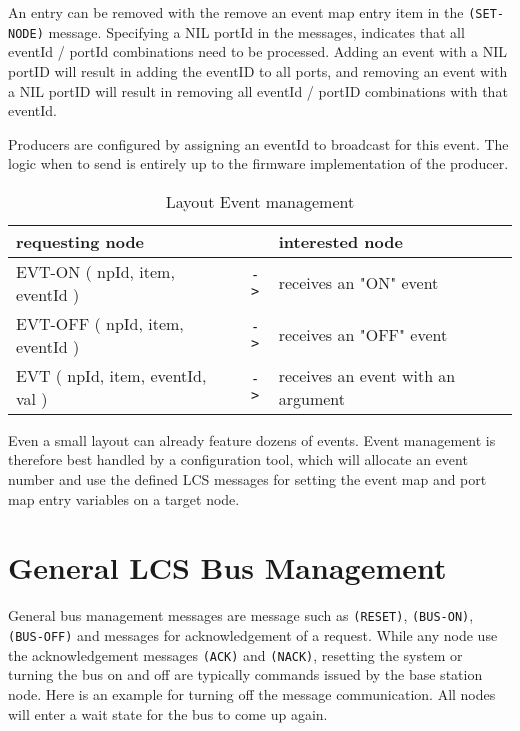 An entry can be removed with the remove an event map entry item in the \texttt{(SET-NODE)} message. Specifying a NIL portId in the messages, indicates that all eventId / portId combinations need to be processed. Adding an event with a NIL portID will result in adding the eventID to all ports, and removing an event with a NIL portID will result in removing all eventId / portID combinations with that eventId.

Producers are configured by assigning an eventId to broadcast for this event. The logic when to send is entirely up to the firmware implementation of the producer.

\begin{table}[ht!]
    \begin{center}
        \caption{Layout Event management}
        \begin{tabular}{|p{}| c |p{}|}
            \toprule
            \textbf{requesting node} & & \textbf{ interested node} \\
            \midrule
            EVT-ON ( npId, item, eventId ) & \texttt{->} & receives an "ON" event \\
            EVT-OFF ( npId, item, eventId ) & \texttt{->} & receives an "OFF" event \\
            \midrule
            EVT ( npId, item, eventId, val ) & \texttt{->} & receives an event with an argument \\
            \bottomrule
        \end{tabular}
    \end{center}
\end{table}

Even a small layout can already feature dozens of events. Event management is therefore best handled by a configuration tool, which will allocate an event number and use the defined LCS messages for setting the event map and port map entry variables on a target node.

\section{General LCS Bus Management}

General bus management messages are message such as \texttt{(RESET)}, \texttt{(BUS-ON)}, \texttt{(BUS-OFF)} and messages for acknowledgement of a request. While any node use the acknowledgement messages \texttt{(ACK)} and \texttt{(NACK)}, resetting the system or turning the bus on and off are typically commands issued by the base station node. Here is an example for turning off the message communication. All nodes will enter a wait state for the bus to come up again.

